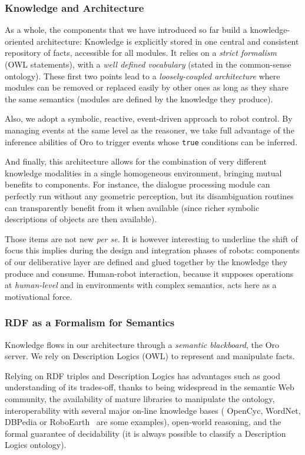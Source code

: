 \documentclass[preprint,3p,times]{elsarticle}
\begin{document}
\subsubsection{Knowledge and Architecture}

As a whole, the components that we have introduced so far build a
knowledge-oriented architecture: Knowledge is explicitly stored in one central
and consistent repository of facts, accessible for all modules. It relies on a
\emph{strict formalism} (OWL statements), with a \emph{well defined vocabulary}
(stated in the common-sense ontology). These first two points lead to a
\emph{loosely-coupled architecture} where modules can be removed or replaced
easily by other ones as long as they share the same semantics (modules are
defined by the knowledge they produce).

Also, we adopt a symbolic, reactive, event-driven approach to robot control. By
managing events at the same level as the reasoner, we take full advantage of the
inference abilities of {\sc Oro} to trigger events whose \texttt{true}
conditions can be inferred.

And finally, this architecture allows for the combination of very different
knowledge modalities in a single homogeneous environment, bringing mutual
benefits to components. For instance, the dialogue processing module can
perfectly run without any geometric perception, but its disambiguation routines
can transparently benefit from it when available (since richer symbolic
descriptions of objects are then available).

Those items are not new \emph{per se}. It is however interesting to underline
the shift of focus this implies during the design and integration phases of
robots: components of our deliberative layer are defined and glued together by
the knowledge they produce and consume. Human-robot interaction, because it
supposes operations at \emph{human-level} and in environments with complex
semantics, acts here as a motivational force.

\subsubsection{RDF as a Formalism for Semantics}

Knowledge flows in our architecture through a \emph{semantic blackboard}, the
{\sc Oro} server. We rely on Description Logics (OWL) to represent and
manipulate facts.

Relying on RDF triples and Description Logics has advantages such as good
understanding of its trades-off, thanks to being widespread in the semantic Web
community, the availability of mature libraries to manipulate the ontology,
interoperability with several major on-line knowledge bases ({\sc
OpenCyc}, {\sc WordNet}, {\sc DBPedia} or {\sc RoboEarth}~\cite{Waibel2011} are
some examples), open-world reasoning, and the formal guarantee of decidability
(it is always possible to classify a Description Logics ontology).
\end{document}
